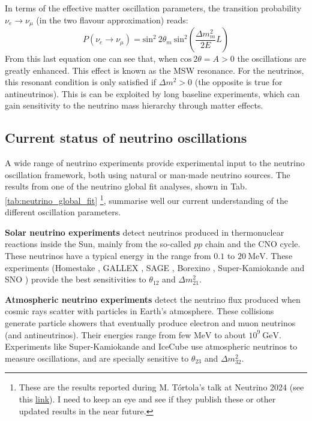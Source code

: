 In terms of the effective matter oscillation parameters, the transition probability $\nu_{e} \rightarrow \nu_{\mu}$ (in the two flavour approximation) reads:
\begin{equation}
	P(\nu_{e} \rightarrow \nu_{\mu}) = \mathrm{sin}^{2}~2\theta_{m} ~ \mathrm{sin}^{2}\left(\frac{\Delta m_{m}^{2}}{2E}L\right)
\end{equation}
From this last equation one can see that, when $\mathrm{cos}~2\theta = A > 0$ the oscillations are greatly enhanced. This effect is known as the MSW resonance. For the neutrinos, this resonant condition is only satisfied if $\Delta m^{2}>0$ (the opposite is true for antineutrinos). This is can be exploited by long baseline experiments, which can gain sensitivity to the neutrino mass hierarchy through matter effects.

\subsection{Current status of neutrino oscillations}

A wide range of neutrino experiments provide experimental input to the neutrino oscillation framework, both using natural or man-made neutrino sources. The results from one of the neutrino global fit analyses, shown in Tab. \ref{tab:neutrino_global_fit} \footnote{These are the results reported during M. T\'{o}rtola's talk at Neutrino 2024 (see this \href{https://agenda.infn.it/event/37867/contributions/233956/attachments/121839/178002/MTortola-Neutrino2024.pdf}{link}). I need to keep an eye and see if they publish these or other updated results in the near future.}, summarise well our current understanding of the different oscillation parameters.

\textbf{Solar neutrino experiments} detect neutrinos produced in thermonuclear reactions inside the Sun, mainly from the so-called $pp$ chain and the CNO cycle. These neutrinos have a typical energy in the range from $0.1$ to $20 \ \mathrm{MeV}$. These experiments (Homestake \cite{Homestake1998}, GALLEX \cite{GALLEX2010}, SAGE \cite{SAGE2009}, Borexino \cite{Borexino2011}, Super-Kamiokande \cite{Super-Kamiokande2005} and SNO \cite{SNO2011}) provide the best sensitivities to $\theta_{12}$ and $\Delta m^{2}_{21}$.

\textbf{Atmospheric neutrino experiments} detect the neutrino flux produced when cosmic rays scatter with particles in Earth's atmosphere. These collisions generate particle showers that eventually produce electron and muon neutrinos (and antineutrinos). Their energies range from few $\mathrm{MeV}$ to about $10^{9} \ \mathrm{GeV}$. Experiments like Super-Kamiokande \cite{Super-Kamiokande2017} and IceCube \cite{IceCube2017} use atmospheric neutrinos to measure oscillations, and are specially sensitive to $\theta_{23}$ and $\Delta m^{2}_{32}$.

